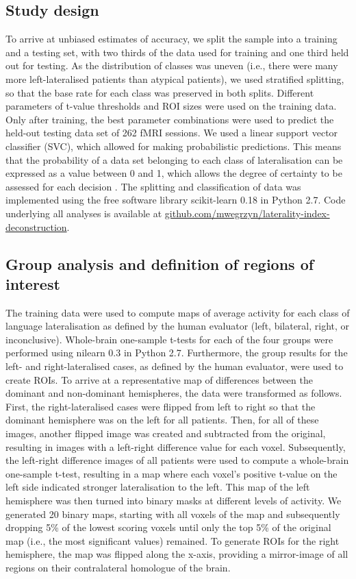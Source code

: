 \documentclass[fleqn,10pt]{SelfArx} %
\begin{document}
\subsection{Study design}
To arrive at unbiased estimates of accuracy, we split the sample into a training and a testing set, with two thirds of the data used for training and one third held out for testing. As the distribution of classes was uneven (i.e., there were many more left-lateralised patients than atypical patients), we used stratified splitting, so that the base rate for each class was preserved in both splits. Different parameters of t-value thresholds and ROI sizes were used on the training data. Only after training, the best parameter combinations were used to predict the held-out testing data set of 262 fMRI sessions. We used a linear support vector classifier (SVC), which allowed for making probabilistic predictions. This means that the probability of a data set belonging to each class of lateralisation can be expressed as a value between 0 and 1, which allows the degree of certainty to be assessed for each decision \citep{Wu_2004}. The splitting and classification of data was implemented using the free software library scikit-learn 0.18 \citep{Pedregosa_2011} in Python 2.7. Code underlying all analyses is available at \href{https://github.com/mwegrzyn/laterality-index-deconstruction}{github.com/mwegrzyn/laterality-index-deconstruction}.

\subsection{Group analysis and definition of regions of interest}
The training data were used to compute maps of average activity for each class of language lateralisation as defined by the human evaluator (left, bilateral, right, or inconclusive). Whole-brain one-sample t-tests for each of the four groups were performed using nilearn 0.3 \citep{Abraham_2014} in Python 2.7. Furthermore, the group results for the left- and right-lateralised cases, as defined by the human evaluator, were used to create ROIs. To arrive at a representative map of differences between the dominant and non-dominant hemispheres, the data were transformed as follows. First, the right-lateralised cases were flipped from left to right so that the dominant hemisphere was on the left for all patients. Then, for all of these images, another flipped image was created and subtracted from the original, resulting in images with a left-right difference value for each voxel. Subsequently, the left-right difference images of all patients were used to compute a whole-brain one-sample t-test, resulting in a map where each voxel’s positive t-value on the left side indicated stronger lateralisation to the left. This map of the left hemisphere was then turned into binary masks at different levels of activity. We generated 20 binary maps, starting with all voxels of the map and subsequently dropping 5\% of the lowest scoring voxels until only the top 5\% of the original map (i.e., the most significant values) remained. To generate ROIs for the right hemisphere, the map was flipped along the x-axis, providing a mirror-image of all regions on their contralateral homologue of the brain.
\end{document}
